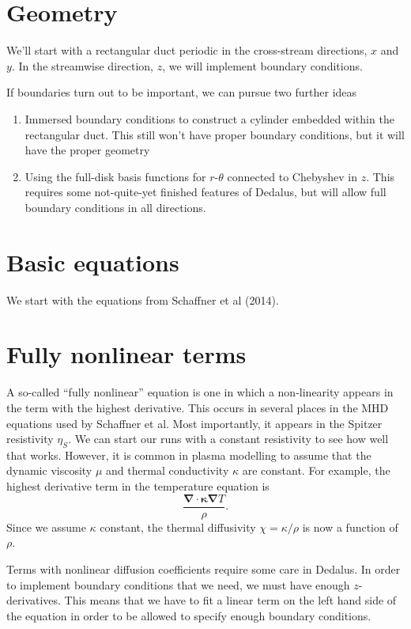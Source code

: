 \documentclass{article}
\begin{document}
\section{Geometry}
\label{sec:geom}

We'll start with a rectangular duct periodic in the cross-stream directions, $x$ and $y$. In the streamwise direction, $z$, we will implement boundary conditions.

If boundaries turn out to be important, we can pursue two further ideas

\begin{enumerate}
\item Immersed boundary conditions to construct a cylinder embedded within the rectangular duct. This still won't have proper boundary conditions, but it will have the proper geometry
\item Using the full-disk basis functions for $r$-$\theta$ connected to Chebyshev in $z$. This requires some not-quite-yet finished features of Dedalus, but will allow full boundary conditions in all directions.
\end{enumerate}
\section{Basic equations}
\label{sec:equations}

We start with the equations from Schaffner et al (2014).

\section{Fully nonlinear terms}
\label{sec:fully_nonlinear}

A so-called ``fully nonlinear'' equation is one in which a non-linearity appears in the term with the highest derivative. This occurs in several places in the MHD equations used by Schaffner et al. Most importantly, it appears in the Spitzer resistivity $\eta_S$. We can start our runs with a constant resistivity to see how well that works. However, it is common in plasma modelling to assume that the dynamic viscosity $\mu$ and thermal conductivity $\kappa$ are constant. For example, the highest derivative term in the temperature equation is
\begin{equation}
  \label{eq:heat_diff}
 \frac{\mathbf{\nabla \cdot \kappa \nabla} T}{\rho}.
\end{equation}
Since we assume $\kappa$ constant, the thermal diffusivity $\chi = \kappa/\rho$ is now a function of $\rho$. 


Terms with nonlinear diffusion coefficients require some care in Dedalus. In order to implement boundary conditions that we need, we must have enough $z$-derivatives. This means that we have to fit a linear term on the left hand side of the equation in order to be allowed to specify enough boundary conditions. 
\end{document}
